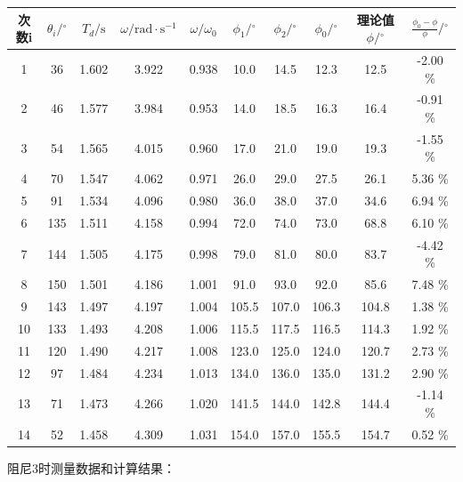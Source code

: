 \documentclass[UTF8]{ctexart}
\begin{document}
\begin{tabular}{|c|c|c|c|c|c|c|c|c|c|}
    \hline 次数i &    $\theta_{i} /{ }^{\circ}$ & $T_{d} / \mathrm{s}$ & $\omega / \mathrm{rad} \cdot \mathrm{s}^{-1} $&$ \omega / \omega_{0}$ & $\phi_{1} /{ }^{\circ} $& $\phi_{2} /{ }^{\circ}$ & $\phi_{0} /{ }^{\circ} $&  理论值 $ \phi /{ }^{\circ}$ & $\frac{\phi_{0}-\phi}{\phi} /{ }^{\circ}$ \\
    \hline 1 & 36 & 1.602 & 3.922 & 0.938 & 10.0 & 14.5 & 12.3 & 12.5 & -2.00 \% \\
    \hline 2 & 46 & 1.577 & 3.984 & 0.953 & 14.0 & 18.5 & 16.3 & 16.4 & -0.91 \% \\
    \hline 3 & 54 & 1.565 & 4.015 & 0.960 & 17.0 & 21.0 & 19.0 & 19.3 & -1.55 \% \\
    \hline 4 & 70 & 1.547 & 4.062 & 0.971 & 26.0 & 29.0 & 27.5 & 26.1 & 5.36 \% \\
    \hline 5 & 91 & 1.534 & 4.096 & 0.980 & 36.0 & 38.0 & 37.0 & 34.6 & 6.94 \% \\
    \hline 6 & 135 & 1.511 & 4.158 & 0.994 & 72.0 & 74.0 & 73.0 & 68.8 & 6.10 \% \\
    \hline 7 & 144 & 1.505 & 4.175 & 0.998 & 79.0 & 81.0 & 80.0 & 83.7 & -4.42 \% \\
    \hline 8 & 150 & 1.501 & 4.186 & 1.001 & 91.0 & 93.0 & 92.0 & 85.6 & 7.48 \% \\
    \hline 9 & 143 & 1.497 & 4.197 & 1.004 & 105.5 & 107.0 & 106.3 & 104.8 & 1.38 \% \\
    \hline 10 & 133 & 1.493 & 4.208 & 1.006 & 115.5 & 117.5 & 116.5 & 114.3 & 1.92 \% \\
    \hline 11 & 120 & 1.490 & 4.217 & 1.008 & 123.0 & 125.0 & 124.0 & 120.7 & 2.73 \% \\
    \hline 12 & 97 & 1.484 & 4.234 & 1.013 & 134.0 & 136.0 & 135.0 & 131.2 & 2.90 \% \\
    \hline 13 & 71 & 1.473 & 4.266 & 1.020 & 141.5 & 144.0 & 142.8 & 144.4 & -1.14 \% \\
    \hline 14 & 52 & 1.458 & 4.309 & 1.031 & 154.0 & 157.0 & 155.5 & 154.7 & 0.52 \% \\
    \hline
\end{tabular}

阻尼3时测量数据和计算结果：\\
\end{document}

